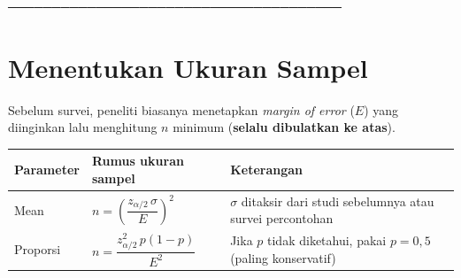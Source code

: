 \documentclass[
  indonesian,
  letterpaper,
]{book}
\newcounter{none} %
\begin{document}
──────────────────────────────────────

\section{Menentukan Ukuran Sampel}\label{menentukan-ukuran-sampel}

Sebelum survei, peneliti biasanya menetapkan \emph{margin of error}
(\(E\)) yang diinginkan lalu menghitung \(n\) minimum (\textbf{selalu
dibulatkan ke atas}).

{\def\LTcaptype{none} %
\begin{longtable}[]{@{}
  >{\raggedright\arraybackslash}p{}
  >{\raggedright\arraybackslash}p{}
  >{\raggedright\arraybackslash}p{}@{}}
\toprule\noalign{}
\begin{minipage}[b]{\linewidth}\raggedright
Parameter
\end{minipage} & \begin{minipage}[b]{\linewidth}\raggedright
Rumus ukuran sampel
\end{minipage} & \begin{minipage}[b]{\linewidth}\raggedright
Keterangan
\end{minipage} \\
\midrule\noalign{}
\endhead
\bottomrule\noalign{}
\endlastfoot
Mean & \(n = \left(\dfrac{z_{\alpha/2}\,\sigma}{E}\right)^2\) &
\(\sigma\) ditaksir dari studi sebelumnya atau survei percontohan \\
Proporsi & \(n = \dfrac{z_{\alpha/2}^2\,p(1-p)}{E^2}\) & Jika \(p\)
tidak diketahui, pakai \(p = 0{,}5\) (paling konservatif) \\
\end{longtable}
}
\end{document}
